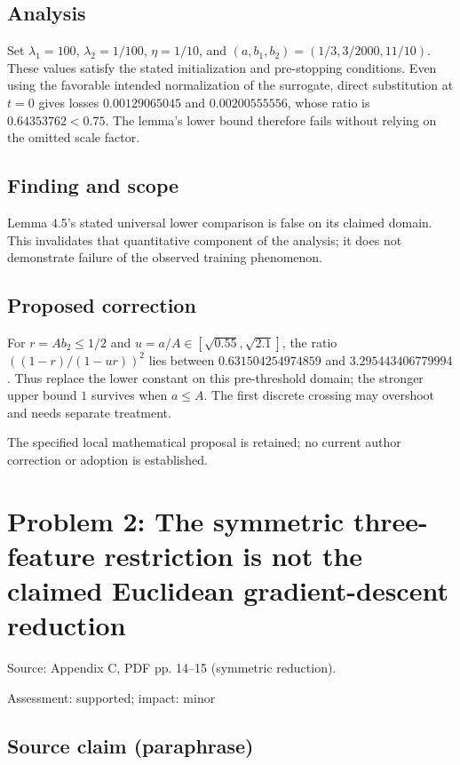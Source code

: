 \documentclass[11pt]{article}
\begin{document}
\subsection*{Analysis}

Set \(\lambda_1=100\), \(\lambda_2=1/100\), \(\eta=1/10\), and \((a,b_1,b_2)=(1/3,3/2000,11/10)\). These values satisfy the stated initialization and pre-stopping conditions. Even using the favorable intended normalization of the surrogate, direct substitution at \(t=0\) gives losses \(0.00129065045\) and \(0.00200555556\), whose ratio is \(0.64353762<0.75\). The lemma's lower bound therefore fails without relying on the omitted scale factor.

\subsection*{Finding and scope}

Lemma 4.5's stated universal lower comparison is false on its claimed domain. This invalidates that quantitative component of the analysis; it does not demonstrate failure of the observed training phenomenon.

\subsection*{Proposed correction}

For \(r=Ab_2\le1/2\) and \(u=a/A\in[\sqrt{0.55},\sqrt{2.1}]\), the ratio \(((1-r)/(1-ur))^2\) lies between \(0.631504254974859\) and \(3.295443406779994\). Thus replace the lower constant on this pre-threshold domain; the stronger upper bound \(1\) survives when \(a\le A\). The first discrete crossing may overshoot and needs separate treatment.

The specified local mathematical proposal is retained; no current author correction or adoption is established.

\section*{Problem 2: The symmetric three-feature restriction is not the claimed Euclidean gradient-descent reduction}

Source: Appendix C, PDF pp. 14–15 (symmetric reduction).

Assessment: supported; impact: minor

\subsection*{Source claim (paraphrase)}
\end{document}
